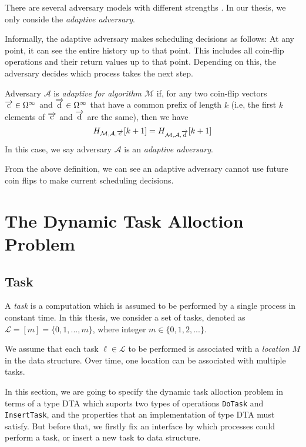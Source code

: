 There are several adversary models with different strengths \cite{DBLP:journals/corr/cs-DS-0209014}.
In our thesis, we only conside the \emph{adaptive adversary}.

Informally, the adaptive adversary makes scheduling
decisions as follows: At any point, it can see the entire history up to that point.
This includes all coin-flip operations and their return values up to that point. Depending on this,
the adversary decides which process takes the next step.

Adversary $\mathcal{A}$ is \emph{adaptive for algorithm $\mathcal{M}$} \cite{golab2011linearizable}
if, for any two coin-flip vectors $\overrightarrow{\rm c} \in \Omega^{\infty}$ and $\overrightarrow{\rm d} \in \Omega^{\infty}$ that have a common prefix
of length $k$ (i.e, the first $k$ elements of $\overrightarrow{\rm c}$ and $\overrightarrow{\rm d}$ are the same), then we have
$$H_{\mathcal{M},\mathcal{A}, \overrightarrow{\rm c}}[k+1] = H_{\mathcal{M},\mathcal{A}, \overrightarrow{\rm d}}[k+1]$$
In this case, we say adversary $\mathcal{A}$ is an \emph{adaptive adversary}.

From the above definition, we can see an adaptive adversary cannot use
future coin flips to make current scheduling decisions.

\section{The Dynamic Task Alloction Problem}

\subsection{Task}

A \emph{task} is a computation which is assumed to be performed by a single process in constant time\cite{georgiou2007all}.
In this thesis, we consider a set of tasks, denoted as $\mathcal{L} = [m] = \{0, 1, ..., m\}$, where integer $m \in \{0, 1, 2, ...\}$.

We assume that each task $\ell \in \mathcal{L}$ to be performed is associated with a \emph{location} $M$
in the data structure. Over time, one location can be associated with multiple tasks.

In this section, we are going to specify the dynamic task alloction problem in terms of a type DTA which
suports two types of operations \texttt{DoTask} and \texttt{InsertTask}, and the properties
that an implementation of type DTA must satisfy. But before that, we firstly fix an interface by which processes could
perform a task, or insert a new task to data structure.

